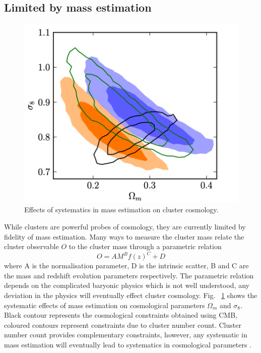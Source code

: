 \subsection{Limited by mass estimation}
\begin{figure}[ht]
\includegraphics[width = \columnwidth]{figs/mass_cosmology.png}
\caption{Effects of systematics in mass estimation on cluster cosmology.}
\label{m_cosmo}
\end{figure}
While clusters are powerful probes of cosmology, they are currently limited by fidelity of mass estimation. Many ways to measure the cluster mass relate the cluster observable $O$ to the cluster mass through a parametric relation 
\begin{equation}
O = A M^{B} f(z)^{C} +D
\end{equation} 
where A is the normalisation parameter, D is the intrinsic scatter, B and C are the mass and redshift evolution parameters respectively. The parametric relation depends on the complicated baryonic physics which is not well understood, any deviation in the physics will eventually effect cluster cosmology. Fig. ~\ref{m_cosmo} shows the systematic effects of mass estimation on cosmological parameters $\Omega_{m}$ and $\sigma_{8}$. Black contour represents the cosmological constraints obtained using CMB, coloured contours represent constraints due to cluster number count. Cluster number count provides complementary constraints, however, any systematic in mass estimation will eventually lead to systematics in cosmological parameters \cite{hasselfield13}.


